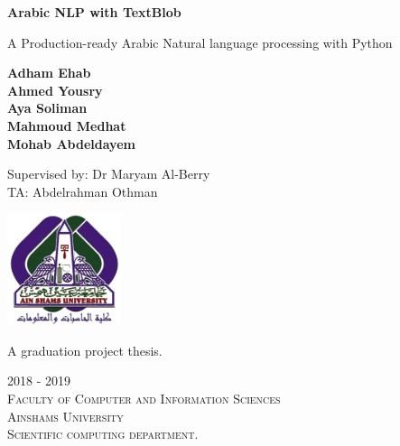 \begin{titlepage}
    \begin{center}
        \vspace*{0.9cm}
        
        \Huge
        \textbf{Arabic NLP with TextBlob}
        
        \vspace{0.5cm}
        
        \LARGE
        A Production-ready Arabic Natural language processing with Python 
        
        \vspace{1.5cm}
        
        \Large
        \textbf{Adham Ehab} \\
        \textbf{Ahmed Yousry}\\
        \textbf{Aya Soliman}\\
        \textbf{Mahmoud Medhat}\\
        \textbf{Mohab Abdeldayem}\\
        
        \vspace{0.5cm}
        
        Supervised by: Dr Maryam Al-Berry \\
                       TA: Abdelrahman Othman\\
        
        
        \vspace{0.3cm}
        
        \includegraphics[width=0.25\textwidth]{Images/fcis_logo.png}
        
        \vspace{0.8cm}
        
        \Large
        A graduation project thesis.
        
        \vspace{0.5cm}
        
        
	    \textsc{ 
	    2018 - 2019\\
	    Faculty of Computer and Information Sciences\\
        Ainshams University \\
        Scientific computing department.}
    \end{center}
\end{titlepage}